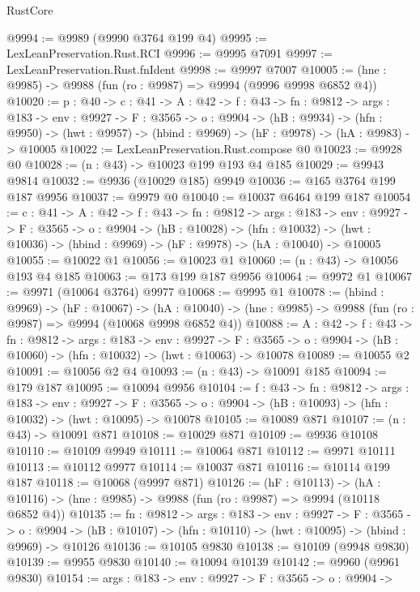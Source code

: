 \begin{lexlean}{RustCore}
\begin{coremodule}
@9994 := @9989 (@9990 @3764 @199 @4)
@9995 := LexLeanPreservation.Rust.RCI
@9996 := @9995 @7091
@9997 := LexLeanPreservation.Rust.fnIdent
@9998 := @9997 @7007
@10005 := (hne : @9985) -> @9988 (fun (ro : @9987) => @9994 (@9996 @9998 @6852 @4))
@10020 := {p : @40} ->
  {c : @41} ->
  {A : @42} ->
  {f : @43} ->
  {fn : @9812} ->
  {args : @183} ->
  {env : @9927} ->
  {F : @3565} ->
  {o : @9904} ->
  (hB : @9934) ->
  (hfn : @9950) -> (hwt : @9957) -> (hbind : @9969) -> (hF : @9978) -> (hA : @9983) -> @10005
@10022 := LexLeanPreservation.Rust.compose @0
@10023 := @9928 @0
@10028 := (n : @43) -> @10023 @199 @193 @4 @185
@10029 := @9943 @9814
@10032 := @9936 (@10029 @185) @9949
@10036 := @165 @3764 @199 @187 @9956
@10037 := @9979 @0
@10040 := @10037 @6464 @199 @187
@10054 := {c : @41} ->
  {A : @42} ->
  {f : @43} ->
  {fn : @9812} ->
  {args : @183} ->
  {env : @9927} ->
  {F : @3565} ->
  {o : @9904} ->
  (hB : @10028) ->
  (hfn : @10032) -> (hwt : @10036) -> (hbind : @9969) -> (hF : @9978) -> (hA : @10040) -> @10005
@10055 := @10022 @1
@10056 := @10023 @1
@10060 := (n : @43) -> @10056 @193 @4 @185
@10063 := @173 @199 @187 @9956
@10064 := @9972 @1
@10067 := @9971 (@10064 @3764) @9977
@10068 := @9995 @1
@10078 := (hbind : @9969) ->
  (hF : @10067) ->
  (hA : @10040) -> (hne : @9985) -> @9988 (fun (ro : @9987) => @9994 (@10068 @9998 @6852 @4))
@10088 := {A : @42} ->
  {f : @43} ->
  {fn : @9812} ->
  {args : @183} ->
  {env : @9927} ->
  {F : @3565} -> {o : @9904} -> (hB : @10060) -> (hfn : @10032) -> (hwt : @10063) -> @10078
@10089 := @10055 @2
@10091 := @10056 @2 @4
@10093 := (n : @43) -> @10091 @185
@10094 := @179 @187
@10095 := @10094 @9956
@10104 := {f : @43} ->
  {fn : @9812} ->
  {args : @183} ->
  {env : @9927} ->
  {F : @3565} -> {o : @9904} -> (hB : @10093) -> (hfn : @10032) -> (hwt : @10095) -> @10078
@10105 := @10089 @871
@10107 := (n : @43) -> @10091 @871
@10108 := @10029 @871
@10109 := @9936 @10108
@10110 := @10109 @9949
@10111 := @10064 @871
@10112 := @9971 @10111
@10113 := @10112 @9977
@10114 := @10037 @871
@10116 := @10114 @199 @187
@10118 := @10068 (@9997 @871)
@10126 := (hF : @10113) ->
  (hA : @10116) -> (hne : @9985) -> @9988 (fun (ro : @9987) => @9994 (@10118 @6852 @4))
@10135 := {fn : @9812} ->
  {args : @183} ->
  {env : @9927} ->
  {F : @3565} ->
  {o : @9904} -> (hB : @10107) -> (hfn : @10110) -> (hwt : @10095) -> (hbind : @9969) -> @10126
@10136 := @10105 @9830
@10138 := @10109 (@9948 @9830)
@10139 := @9955 @9830
@10140 := @10094 @10139
@10142 := @9960 (@9961 @9830)
@10154 := {args : @183} ->
  {env : @9927} ->
  {F : @3565} ->
  {o : @9904} ->

\end{coremodule}
\end{lexlean}
